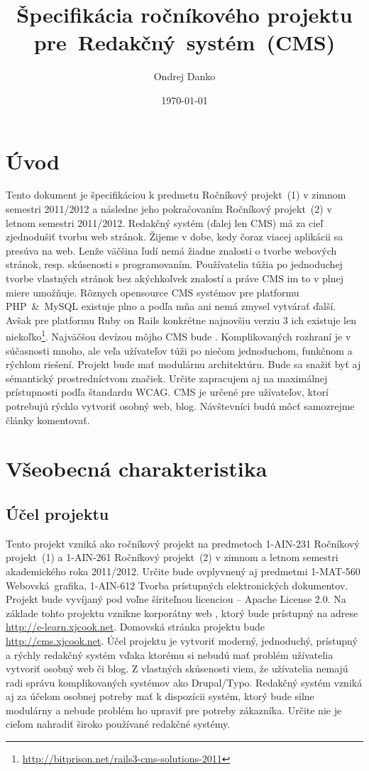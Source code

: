 \documentclass[a4paper,titlepage,11pt]{article}
\title{Špecifikácia ročníkového projektu \mbox{pre Redakčný systém (CMS)}}
\author{Ondrej Danko}
\date{\today}
\begin{document}
\maketitle

\setcounter{tocdepth}{2}
\tableofcontents
\thispagestyle{empty}

\newpage
\setcounter{page}{1}
\section{Úvod}
Tento dokument je špecifikáciou k predmetu Ročníkový projekt~(1) v zimnom semestri 2011/2012 a následne jeho pokračovaním Ročníkový projekt~(2) v letnom semestri 2011/2012. 
Redakčný systém (ďalej len CMS) má za cieľ zjednodušiť tvorbu web stránok. Žijeme v dobe, kedy čoraz viacej aplikácii sa presúva na web. 
Lenže väčšina ľudí nemá žiadne znalosti o tvorbe webových stránok, resp. skúsenosti s programovaním. 
Používatelia túžia po jednoduchej tvorbe vlastných stránok bez akýchkoľvek znalostí a práve CMS im to v plnej miere umožňuje. 
Rôznych opensource CMS systémov pre platformu \mbox{PHP \& MySQL} existuje plno a podľa mňa ani nemá zmysel vytvárať ďalší. 
Avšak pre platformu Ruby on Rails konkrétne najnovšiu verziu 3 ich existuje len niekoľko\footnote{\url{http://bitprison.net/rails3-cms-solutions-2011}}.
Najväčšou devízou môjho CMS bude . 
Komplikovaných rozhraní je v súčasnosti mnoho, ale veľa užívateľov túži po niečom jednoduchom, funkčnom a rýchlom riešení. 
Projekt bude mať modulárnu architektúru. Bude sa snažiť byť aj sémantický prostredníctvom značiek. 
Určite zapracujem aj na maximálnej prístupnosti podľa štandardu WCAG. CMS je určené pre užívateľov, ktorí potrebujú rýchlo vytvoriť osobný web, blog.
Návštevníci budú môcť samozrejme články komentovať.

\newpage
\section{Všeobecná charakteristika}
\subsection{Účel projektu}
Tento projekt vzniká ako ročníkový projekt na predmetoch 1-AIN-231 Ročníkový projekt~(1) a 1-AIN-261 Ročníkový projekt~(2) v zimnom a letnom semestri akademického roka 2011/2012. 
Určite bude ovplyvnený aj predmetmi 1-MAT-560 Webovská~grafika, 1-AIN-612 Tvorba prístupných elektronických dokumentov. 
Projekt bude vyvíjaný pod voľne šíriteľnou licenciou -- Apache License 2.0. 
Na základe tohto projektu vznikne korporátny web , ktorý bude prístupný na adrese \url{http://e-learn.xjcook.net}. 
Domovská stránka projektu bude \url{http://cms.xjcook.net}.
Účel projektu je vytvoriť moderný, jednoduchý, prístupný a rýchly redakčný systém vďaka ktorému si nebudú mať problém užívatelia vytvoriť osobný web či blog. 
Z vlastných skúsenosti viem, že užívatelia nemajú radi správu komplikovaných systémov ako \mbox{Drupal\slash Typo}. 
Redakčný systém vzniká aj za účelom osobnej potreby mať k dispozícii systém, ktorý bude silne modulárny a nebude problém ho upraviť pre potreby zákazníka. 
Určite nie je cieľom nahradiť široko používané redakčné systémy.
\end{document}
